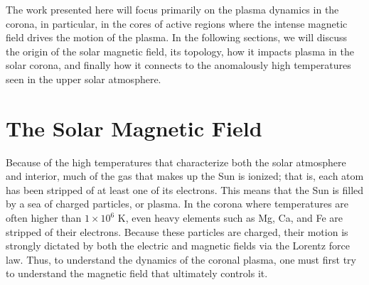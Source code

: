 %
\par The work presented here will focus primarily on the plasma dynamics in the corona, in particular, in the cores of active regions where the intense magnetic field drives the motion of the plasma. In the following sections, we will discuss the origin of the solar magnetic field, its topology, how it impacts plasma in the solar corona, and finally how it connects to the anomalously high temperatures seen in the upper solar atmosphere.
\section{The Solar Magnetic Field}
\label{sec:magnetic_field}
\par Because of the high temperatures that characterize both the solar atmosphere and interior, much of the gas that makes up the Sun is ionized; that is, each atom has been stripped of at least one of its electrons. This means that the Sun is filled by a sea of charged particles, or plasma. In the corona where temperatures are often higher than $1\times10^6$ K, even heavy elements such as Mg, Ca, and Fe are stripped of their electrons. Because these particles are charged, their motion is strongly dictated by both the electric and magnetic fields via the Lorentz force law. Thus, to understand the dynamics of the coronal plasma, one must first try to understand the magnetic field that ultimately controls it.
%
